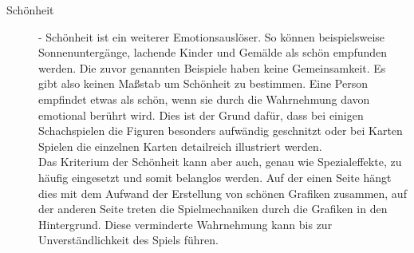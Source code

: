 \begin{description}
%
%
%
\item[Schönheit] - Schönheit ist ein weiterer Emotionsauslöser. So können beispielsweise Sonnenuntergänge, lachende Kinder und Gemälde als schön empfunden werden. Die zuvor genannten Beispiele haben keine Gemeinsamkeit. Es gibt also keinen Maßstab um Schönheit zu bestimmen. Eine Person empfindet etwas als schön, wenn sie durch die Wahrnehmung davon emotional berührt wird. Dies ist der Grund dafür, dass bei einigen Schachspielen die Figuren besonders aufwändig geschnitzt oder bei Karten Spielen die einzelnen Karten detailreich illustriert werden. \cite[S. 26]{Adams:1515529} \\
Das Kriterium der Schönheit kann aber auch, genau wie Spezialeffekte, zu häufig eingesetzt und somit belanglos werden. Auf der einen Seite hängt dies mit dem Aufwand der Erstellung von schönen Grafiken zusammen, auf der anderen Seite treten die Spielmechaniken durch die Grafiken in den Hintergrund. Diese verminderte Wahrnehmung kann bis zur Unverständlichkeit des Spiels führen. \cite[S. 26]{Adams:1515529}

%
%
%


\end{description}
